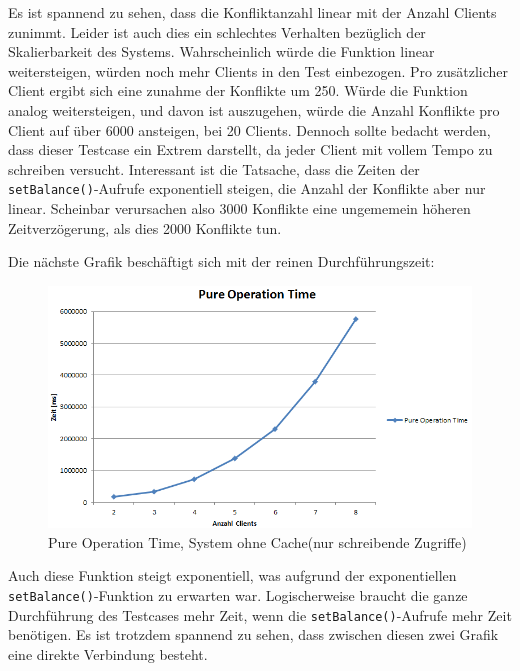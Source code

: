 Es ist spannend zu sehen, dass die Konfliktanzahl linear mit der Anzahl Clients zunimmt. Leider ist auch dies ein schlechtes Verhalten bezüglich der Skalierbarkeit des Systems. Wahrscheinlich würde die Funktion linear weitersteigen, würden noch mehr Clients in den Test einbezogen. \newline
Pro zusätzlicher Client ergibt sich eine zunahme der Konflikte um 250. Würde die Funktion analog weitersteigen, und davon ist auszugehen, würde die Anzahl Konflikte pro Client auf über 6000 ansteigen, bei 20 Clients. Dennoch sollte bedacht werden, dass dieser Testcase ein Extrem darstellt, da jeder Client mit vollem Tempo zu schreiben versucht. \newline
Interessant ist die Tatsache, dass die Zeiten der \texttt{setBalance()}-Aufrufe exponentiell steigen, die Anzahl der Konflikte aber nur linear. Scheinbar verursachen also 3000 Konflikte eine ungememein höheren Zeitverzögerung, als dies 2000 Konflikte tun. \newline

Die nächste Grafik beschäftigt sich mit der reinen Durchführungszeit:
\begin{figure}[H]
\begin{center}
\includegraphics[scale=0.6]{images_MessErgebnisse/incrementCachePureOperationTime.png}
\end{center}
\caption{Pure Operation Time, System ohne Cache(nur schreibende Zugriffe)}
\end{figure}

Auch diese Funktion steigt exponentiell, was aufgrund der exponentiellen \texttt{setBalance()}-Funktion zu erwarten war. Logischerweise braucht die ganze Durchführung des Testcases mehr Zeit, wenn die \texttt{setBalance()}-Aufrufe mehr Zeit benötigen. Es ist trotzdem spannend zu sehen, dass zwischen diesen zwei Grafik eine direkte Verbindung besteht.

